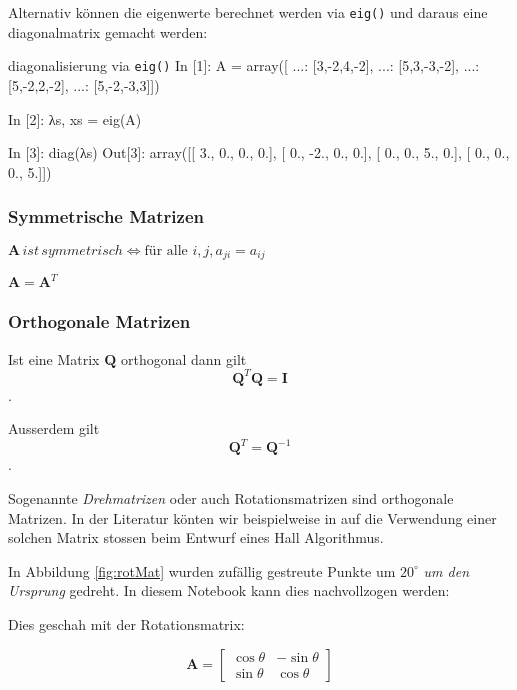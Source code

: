 Alternativ können die eigenwerte berechnet werden via \texttt{eig()} und daraus eine diagonalmatrix gemacht werden:
\begin{python}{diagonalisierung via \texttt{eig()}}
In [1]: A = array([
    ...: [3,-2,4,-2],
    ...: [5,3,-3,-2],
    ...: [5,-2,2,-2],
    ...: [5,-2,-3,3]])

In [2]: λs, xs = eig(A)

In [3]: diag(λs)
Out[3]:
array([[ 3.,  0.,  0.,  0.],
       [ 0., -2.,  0.,  0.],
       [ 0.,  0.,  5.,  0.],
       [ 0.,  0.,  0.,  5.]])
\end{python}


\subsubsection{Symmetrische Matrizen}
$\mathbf{A} \, ist \, symmetrisch \iff \text{für alle } i,j, a_{ji} = a_{ij}$

$\mathbf{A} = \mathbf{A}^T$



\subsubsection{Orthogonale Matrizen}

Ist eine Matrix $\mathbf{Q}$ orthogonal dann gilt 
$$ \mathbf{Q}^T\mathbf{Q} = \mathbf{I} $$.

Ausserdem gilt
$$ \mathbf{Q}^T = \mathbf{Q}^{-1} $$.


Sogenannte \emph{Drehmatrizen} oder auch Rotationsmatrizen sind orthogonale Matrizen. In der Literatur könten wir beispielweise in \citep{puckette2011infuriating} auf die Verwendung einer solchen Matrix stossen beim Entwurf eines Hall Algorithmus. 


In Abbildung \ref{fig:rotMat} wurden zufällig gestreute Punkte um $20^\circ$ \emph{um den Ursprung} gedreht. In diesem Notebook kann dies nachvollzogen werden: 


Dies geschah mit der Rotationsmatrix:


\begin{equation}
    {\displaystyle \mathbf{A}={\begin{bmatrix}\cos \theta &-\sin \theta \\\sin \theta &\cos \theta \end{bmatrix}}}
\end{equation}

